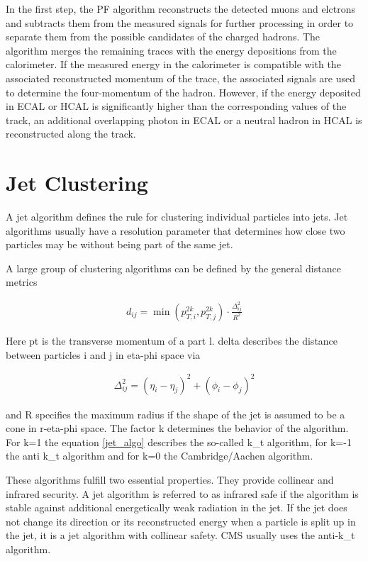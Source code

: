 \documentclass[12pt, a4paper]{thesis}
\begin{document}
In the first step, the PF algorithm reconstructs the detected muons
and elctrons and subtracts them from the measured signals for further
processing in order to separate them from the possible candidates of
the charged hadrons. The algorithm merges the remaining traces with
the energy depositions from the calorimeter. If the measured energy in
the calorimeter is compatible with the associated reconstructed
momentum of the trace, the associated signals are used to determine
the four-momentum of the hadron. However, if the energy deposited in
ECAL or HCAL is significantly higher than the corresponding values of
the track, an additional overlapping photon in ECAL or a neutral
hadron in HCAL is reconstructed along the track.

\clearpage
\section{Jet Clustering}
\label{sec:orgfca5f43}

A jet algorithm defines the rule for clustering individual particles
into jets. Jet algorithms usually have a resolution parameter that
determines how close two particles may be without being part of the
same jet.

A large group of clustering algorithms can be defined by the general
distance metrics

\begin{align}
  d_{ij} = \min(p^{2k}_{T,i}, p^{2k}_{T,j}) \cdot \frac{\Delta^{2}_{ij}}{R^{2}} \label{jet_algo}
\end{align}


Here pt is the transverse momentum of a part l. delta describes the
distance between particles i and j in eta-phi space via

\begin{align}
  \Delta_{ij}^{2} = (\eta_{i} - \eta_{j})^{2} + (\phi_{i} - \phi_{j})^{2}
\end{align}

and R specifies the maximum radius if the shape of the jet is assumed
to be a cone in r-eta-phi space. The factor k determines the behavior
of the algorithm. For k=1 the equation \eqref{jet_algo} describes the
so-called k\_t algorithm, for k=-1 the anti k\_t algorithm and for k=0
the Cambridge/Aachen algorithm.

These algorithms fulfill two essential properties. They provide
collinear and infrared security. A jet algorithm is referred to as
infrared safe if the algorithm is stable against additional
energetically weak radiation in the jet. If the jet does not change
its direction or its reconstructed energy when a particle is split up
in the jet, it is a jet algorithm with collinear safety. CMS usually
uses the anti-k\_t algorithm.
\end{document}
